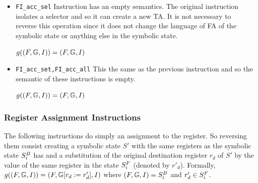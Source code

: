 \begin{itemize}
	\item {\tt FI\_acc\_sel}
		Instruction has an empty semantics.
		The original instruction isolates a selector
		and so it can create a new TA.
		It is not necessary to reverse this operation
		since it does not change the language of FA of the
		symbolic state or anything else in the symbolic state.
		
		$g((F, \mathbb{G}, I)) = (F, \mathbb{G}, I)$

	\item {\tt FI\_acc\_set,FI\_acc\_all}
		This the same as the previous instruction and so
		the semantic of these instructions is empty.
		
		$g((F, \mathbb{G}, I)) = (F, \mathbb{G}, I)$

\end{itemize}

\subsubsection{Register Assignment Instructions}
The following instructions do simply an assignment to the register.
So reversing them consist creating a symbolic state $S'$ with
the same registers as the symbolic state $S^{B}_{i}$ has
and a substitution of the original destination register $r_d$ of $S'$
by the value of the same register in the state $S^{F}_{i}$ (denoted by $r'_d$).
Formally, $g((F, \mathbb{G}, I)) = (F, \mathbb{G} [r_{d} := r'_{d}]
			, I)$
			where $(F, \mathbb{G}, I) = S^{B}_{i}$ and $r'_{d} \in S^{F}_{i}$.

